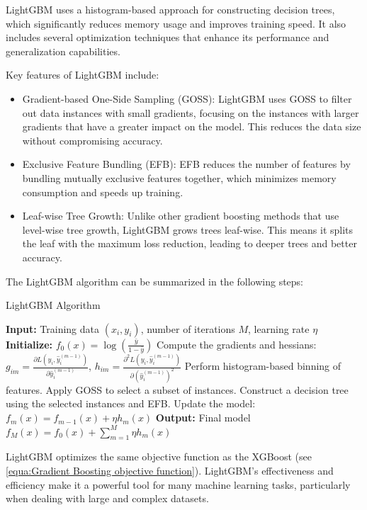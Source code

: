 \documentclass[12pt]{article}
\begin{document}
LightGBM uses a histogram-based approach for constructing decision trees, which significantly reduces memory usage and improves training speed. It also includes several optimization techniques that enhance its performance and generalization capabilities.
 
Key features of LightGBM include:
 
\begin{itemize}
    \item Gradient-based One-Side Sampling (GOSS): LightGBM uses GOSS to filter out data instances with small gradients, focusing on the instances with larger gradients that have a greater impact on the model. This reduces the data size without compromising accuracy.
    \item Exclusive Feature Bundling (EFB): EFB reduces the number of features by bundling mutually exclusive features together, which minimizes memory consumption and speeds up training.
    \item Leaf-wise Tree Growth: Unlike other gradient boosting methods that use level-wise tree growth, LightGBM grows trees leaf-wise. This means it splits the leaf with the maximum loss reduction, leading to deeper trees and better accuracy.
\end{itemize}
 
The LightGBM algorithm can be summarized in the following steps:
 
\begin{algorithm}[H]
\caption{LightGBM Algorithm}
\begin{algorithmic}[1]
    \State \textbf{Input:} Training data $(x_i, y_i)$, number of iterations $M$, learning rate $\eta$
    \State \textbf{Initialize:} $f_0(x) = \log\left(\frac{\bar{y}}{1 - \bar{y}}\right)$
        \State Compute the gradients and hessians: $g_{im} = \frac{\partial L(y_i, \hat{y}_i^{(m-1)})}{\partial \hat{y}_i^{(m-1)}}$, $h_{im} = \frac{\partial^2 L(y_i, \hat{y}_i^{(m-1)})}{\partial (\hat{y}_i^{(m-1)})^2}$
        \State Perform histogram-based binning of features.
        \State Apply GOSS to select a subset of instances.
        \State Construct a decision tree using the selected instances and EFB.
        \State Update the model: $f_m(x) = f_{m-1}(x) + \eta h_m(x)$
    \EndFor
    \State \textbf{Output:} Final model $f_M(x) = f_0(x) + \sum_{m=1}^{M} \eta h_m(x)$
\end{algorithmic}
\end{algorithm}
 

\noindent LightGBM optimizes the same objective function as the XGBoost (see \autoref{equa:Gradient Boosting objective function}). LightGBM's effectiveness and efficiency make it a powerful tool for many machine learning tasks, particularly when dealing with large and complex datasets.
\end{document}

